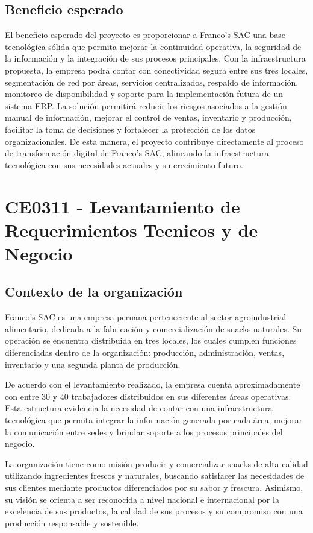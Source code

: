 \documentclass[11pt, a4paper, oneside]{report}
\begin{document}
\section{Beneficio esperado}
El beneficio esperado del proyecto es proporcionar a Franco's SAC una base tecnológica sólida que permita mejorar la continuidad operativa, la seguridad de la información y la integración de sus procesos principales. Con la infraestructura propuesta, la empresa podrá contar con conectividad segura entre sus tres locales, segmentación de red por áreas, servicios centralizados, respaldo de información, monitoreo de disponibilidad y soporte para la implementación futura de un sistema ERP.
La solución permitirá reducir los riesgos asociados a la gestión manual de información, mejorar el control de ventas, inventario y producción, facilitar la toma de decisiones y fortalecer la protección de los datos organizacionales. De esta manera, el proyecto contribuye directamente al proceso de transformación digital de Franco's SAC, alineando la infraestructura tecnológica con sus necesidades actuales y su crecimiento futuro.

\chapter{CE0311 - Levantamiento de Requerimientos Tecnicos y de Negocio}

\section{Contexto de la organización}

Franco's SAC es una empresa peruana perteneciente al sector agroindustrial alimentario, dedicada a la fabricación y comercialización de snacks naturales. Su operación se encuentra distribuida en tres locales, los cuales cumplen funciones diferenciadas dentro de la organización: producción, administración, ventas, inventario y una segunda planta de producción.

De acuerdo con el levantamiento realizado, la empresa cuenta aproximadamente con entre 30 y 40 trabajadores distribuidos en sus diferentes áreas operativas. Esta estructura evidencia la necesidad de contar con una infraestructura tecnológica que permita integrar la información generada por cada área, mejorar la comunicación entre sedes y brindar soporte a los procesos principales del negocio.

La organización tiene como misión producir y comercializar snacks de alta calidad utilizando ingredientes frescos y naturales, buscando satisfacer las necesidades de sus clientes mediante productos diferenciados por su sabor y frescura. Asimismo, su visión se orienta a ser reconocida a nivel nacional e internacional por la excelencia de sus productos, la calidad de sus procesos y su compromiso con una producción responsable y sostenible.
\end{document}
